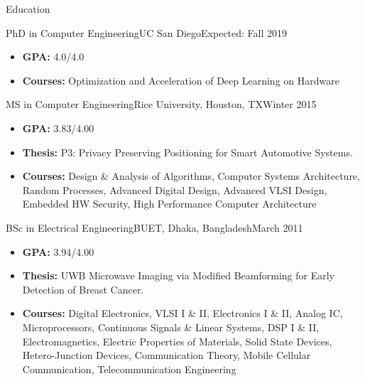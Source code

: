\documentclass[]{mcdowellcv}
\begin{document}
	\begin{cvsection}{Education}
		\begin{cvsubsection}{PhD in Computer Engineering}{UC San Diego}{Expected: Fall 2019}
			\begin{itemize}
				\item \textbf{GPA:} 4.0/4.0
				\item \textbf{Courses:} Optimization and Acceleration of Deep Learning on Hardware
			\end{itemize}
		\end{cvsubsection}	
		
		\begin{cvsubsection}{MS in Computer Engineering}{Rice University, Houston, TX}{Winter 2015}
			\begin{itemize}
				\item \textbf{GPA:} 3.83/4.00
				\item \textbf{Thesis:} P3: Privacy Preserving Positioning for Smart Automotive Systems.
				\item \textbf{Courses:} Design \& Analysis of Algorithms, Computer Systems Architecture, Random Processes, Advanced Digital Design, Advanced VLSI Design, Embedded HW Security, High Performance Computer Architecture
			\end{itemize}
		\end{cvsubsection}
		
		\begin{cvsubsection}{BSc in Electrical Engineering}{BUET, Dhaka, Bangladesh}{March 2011}
			\begin{itemize}
				\item \textbf{GPA:} 3.94/4.00
				\item \textbf{Thesis:} UWB Microwave Imaging via Modified Beamforming for Early Detection of Breast Cancer.
				\item \textbf{Courses:} Digital Electronics, VLSI I \& II, Electronics I \& II, Analog IC, Microprocessors, Continuous Signals \& Linear Systems, DSP I \& II, Electromagnetics, Electric Properties of Materials, Solid State Devices, Hetero-Junction Devices, Communication Theory, Mobile Cellular Communication, Telecommunication Engineering
			\end{itemize}
		\end{cvsubsection}
	\end{cvsection}
	
\end{document}
